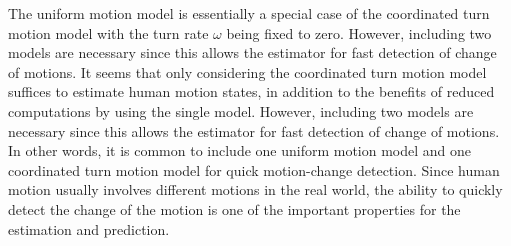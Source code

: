 \documentclass[letterpaper, 10 pt, conference]{ieeeconf}
\begin{document}
	The uniform motion model is essentially a special case of the coordinated turn motion model with the turn rate $\omega$ being fixed to zero.
	However, including two models are necessary since this allows the estimator for fast detection of change of motions. 
	It seems that only considering the coordinated turn motion model suffices to estimate human motion states, in addition to the benefits of reduced computations by using the single model.
	However, including two models are necessary since this allows the estimator for fast detection of change of motions. In other words, it is common to include one uniform motion model and one coordinated turn motion model for quick motion-change detection. 
	Since human motion usually involves different motions in the real world, the ability to quickly detect the change of the motion is one of the important properties for the estimation and prediction.          	
	
	
\end{document}
